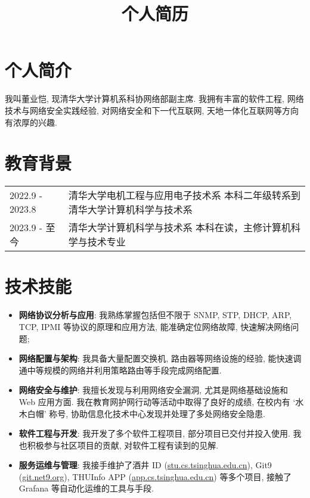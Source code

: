 \documentclass[a4paper, 10pt]{article}
\title{个人简历}
\date{}
\begin{document}
\maketitle
\vspace{-2em}

\section*{个人简介}
我叫董业恺, 现清华大学计算机系科协网络部副主席. 我拥有丰富的软件工程, 网络技术与网络安全实践经验, 对网络安全和下一代互联网, 天地一体化互联网等方向有浓厚的兴趣.

\section*{教育背景}
\noindent
\begin{tabular}{p{}p{}}
    2022.9 - 2023.8 & 清华大学电机工程与应用电子技术系 \newline
        \fontsize{8pt}{10pt}\selectfont 本科二年级转系到清华大学计算机科学与技术系 \\

    2023.9 - 至今 & 清华大学计算机科学与技术系 \newline
        \fontsize{8pt}{10pt}\selectfont 本科在读，主修计算机科学与技术专业 \\
\end{tabular}

\section*{技术技能}
\begin{itemize}[left=0pt]
    \item \textbf{网络协议分析与应用}: 我熟练掌握包括但不限于 SNMP, STP, DHCP, ARP, TCP, IPMI 等协议的原理和应用方法, 能准确定位网络故障, 快速解决网络问题;
    \item \textbf{网络配置与架构}: 我具备大量配置交换机, 路由器等网络设施的经验, 能快速调通中等规模的网络并利用策略路由等手段完成网络配置.
    \item \textbf{网络安全与维护}: 我擅长发现与利用网络安全漏洞, 尤其是网络基础设施和 Web 应用方面. 我在教育网护网行动等活动中取得了良好的成绩, 在校内有 `水木白帽' 称号, 协助信息化技术中心发现并处理了多处网络安全隐患.
    \item \textbf{软件工程与开发}: 我开发了多个软件工程项目, 部分项目已交付并投入使用. 我也积极参与社区项目的贡献, 对软件工程有读到的见解.
    \item \textbf{服务运维与管理}: 我接手维护了酒井 ID (\href{https://stu.cs.tsinghua.edu.cn}{stu.cs.tsinghua.edu.cn}), Git9 (\href{https://git.net9.org}{git.net9.org}), THUInfo APP (\href{https://app.cs.tsinghua.edu.cn}{app.cs.tsinghua.edu.cn}) 等多个项目, 接触了 Grafana 等自动化运维的工具与手段.
\end{itemize}
\end{document}
